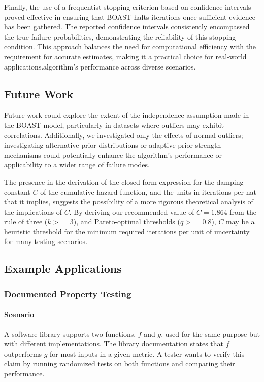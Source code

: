 Finally, the use of a frequentist stopping criterion based on confidence intervals proved effective in ensuring that BOAST halts iterations once sufficient evidence has been gathered. The reported confidence intervals consistently encompassed the true failure probabilities, demonstrating the reliability of this stopping condition. This approach balances the need for computational efficiency with the requirement for accurate estimates, making it a practical choice for real-world applications.algorithm's performance across diverse scenarios.

\subsection{Future Work}

Future work could explore the extent of the independence assumption made in the BOAST model, particularly in datasets where outliers may exhibit correlations. Additionally, we investigated only the effects of normal outliers; investigating alternative prior distributions or adaptive prior strength mechanisms could potentially enhance the algorithm's performance or applicability to a wider range of failure modes.

The presence in the derivation of the closed-form expression for the damping constant $C$ of the cumulative hazard function, and the units in iterations per nat that it implies, suggests the possibility of a more rigorous theoretical analysis of the implications of $C$. By deriving our recommended value of $C = 1.864$ from the rule of three ($k >= 3$), and Pareto-optimal thresholds ($q >= 0.8$), $C$ may be a heuristic threshold for the minimum required iterations per unit of uncertainty for many testing scenarios.

\subsection{Example Applications}

\subsubsection{Documented Property Testing}

\paragraph{Scenario} A software library supports two functions, $f$ and $g$, used for the same purpose but with different implementations. The library documentation states that $f$ outperforms $g$ for most inputs in a given metric. A tester wants to verify this claim by running randomized tests on both functions and comparing their performance.

